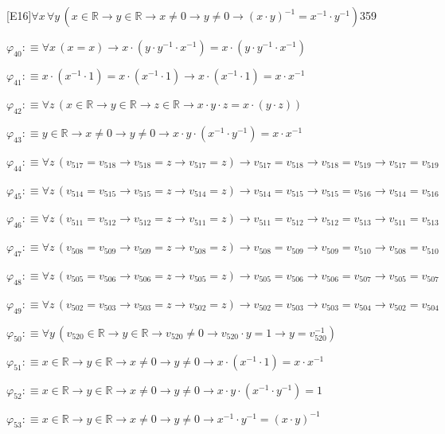 \begin{fullproof}{[E16]}{$\forall x\,\forall y\,(x \in \mathbb{R} \to y \in \mathbb{R} \to x \neq 0 \to y \neq 0 \to (x \cdot y)^{-1} = x^{-1} \cdot y^{-1})$}{359}
\begin{abbrevlist}
\item $\varphi_{40} :\equiv \forall x\,(x = x) \to x \cdot (y \cdot y^{-1} \cdot x^{-1}) = x \cdot (y \cdot y^{-1} \cdot x^{-1})$
\item $\varphi_{41} :\equiv x \cdot (x^{-1} \cdot 1) = x \cdot (x^{-1} \cdot 1) \to x \cdot (x^{-1} \cdot 1) = x \cdot x^{-1}$
\item $\varphi_{42} :\equiv \forall z\,(x \in \mathbb{R} \to y \in \mathbb{R} \to z \in \mathbb{R} \to x \cdot y \cdot z = x \cdot (y \cdot z))$
\item $\varphi_{43} :\equiv y \in \mathbb{R} \to x \neq 0 \to y \neq 0 \to x \cdot y \cdot (x^{-1} \cdot y^{-1}) = x \cdot x^{-1}$
\item $\varphi_{44} :\equiv \forall z\,(v_{517} = v_{518} \to v_{518} = z \to v_{517} = z) \to v_{517} = v_{518} \to v_{518} = v_{519} \to v_{517} = v_{519}$
\item $\varphi_{45} :\equiv \forall z\,(v_{514} = v_{515} \to v_{515} = z \to v_{514} = z) \to v_{514} = v_{515} \to v_{515} = v_{516} \to v_{514} = v_{516}$
\item $\varphi_{46} :\equiv \forall z\,(v_{511} = v_{512} \to v_{512} = z \to v_{511} = z) \to v_{511} = v_{512} \to v_{512} = v_{513} \to v_{511} = v_{513}$
\item $\varphi_{47} :\equiv \forall z\,(v_{508} = v_{509} \to v_{509} = z \to v_{508} = z) \to v_{508} = v_{509} \to v_{509} = v_{510} \to v_{508} = v_{510}$
\item $\varphi_{48} :\equiv \forall z\,(v_{505} = v_{506} \to v_{506} = z \to v_{505} = z) \to v_{505} = v_{506} \to v_{506} = v_{507} \to v_{505} = v_{507}$
\item $\varphi_{49} :\equiv \forall z\,(v_{502} = v_{503} \to v_{503} = z \to v_{502} = z) \to v_{502} = v_{503} \to v_{503} = v_{504} \to v_{502} = v_{504}$
\item $\varphi_{50} :\equiv \forall y\,(v_{520} \in \mathbb{R} \to y \in \mathbb{R} \to v_{520} \neq 0 \to v_{520} \cdot y = 1 \to y = v_{520}^{-1})$
\item $\varphi_{51} :\equiv x \in \mathbb{R} \to y \in \mathbb{R} \to x \neq 0 \to y \neq 0 \to x \cdot (x^{-1} \cdot 1) = x \cdot x^{-1}$
\item $\varphi_{52} :\equiv x \in \mathbb{R} \to y \in \mathbb{R} \to x \neq 0 \to y \neq 0 \to x \cdot y \cdot (x^{-1} \cdot y^{-1}) = 1$
\item $\varphi_{53} :\equiv x \in \mathbb{R} \to y \in \mathbb{R} \to x \neq 0 \to y \neq 0 \to x^{-1} \cdot y^{-1} = (x \cdot y)^{-1}$

\end{abbrevlist}
\end{fullproof}
